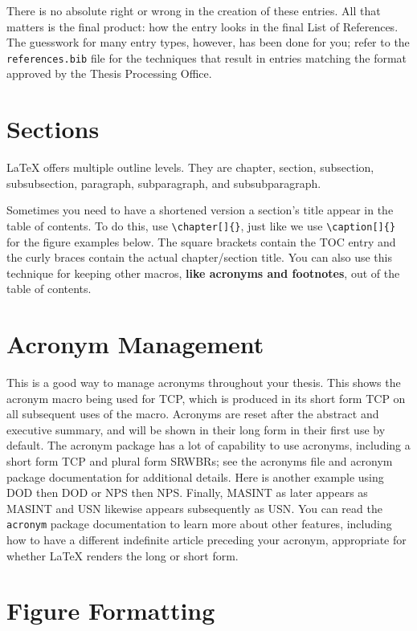 There is no absolute right or wrong in the creation of these entries. All that matters is the final product: how the entry looks in the final List of References. The guesswork for many entry types, however, has been done for you; refer to the {\tt references.bib} file for the techniques that result in entries matching the format approved by the Thesis Processing Office. 

\section{Sections}
\LaTeX{} offers multiple outline levels.
They are chapter, section, subsection, subsubsection, paragraph, subparagraph, and subsubparagraph.

Sometimes you need to have a shortened version a section's title appear in the table of contents.
To do this, use \verb|\chapter[]{}|, just like we use \verb|\caption[]{}| for the figure examples below.
The square brackets contain the TOC entry and the curly braces contain the actual chapter/section title.
You can also use this technique for keeping other macros, \textbf{like acronyms and footnotes}, out of the table of contents.


\section{Acronym Management}
This is a good way to manage acronyms throughout your thesis.
This shows the acronym macro being used for \ac{TCP}, which is produced in its short form \ac{TCP} on all subsequent uses of the macro.
Acronyms are reset after the abstract and executive summary, and will be shown in their long form in their first use by default.
The acronym package has a lot of capability to use acronyms, including a short form \acs{TCP} and plural form \acp{SRWBR}; see the acronyms file and acronym package documentation for additional details.
Here is another example using \ac{DOD} then \ac{DOD} or \ac{NPS} then \ac{NPS}.
Finally, \ac{MASINT} as later appears as \ac{MASINT} and \ac{USN} likewise appears subsequently as \ac{USN}.
You can read the \texttt{acronym} package documentation to learn more about other features, including how to have a different indefinite article preceding your acronym, appropriate for whether \LaTeX{} renders the long or short form.

\section{Figure Formatting}\label{sec:figures}

